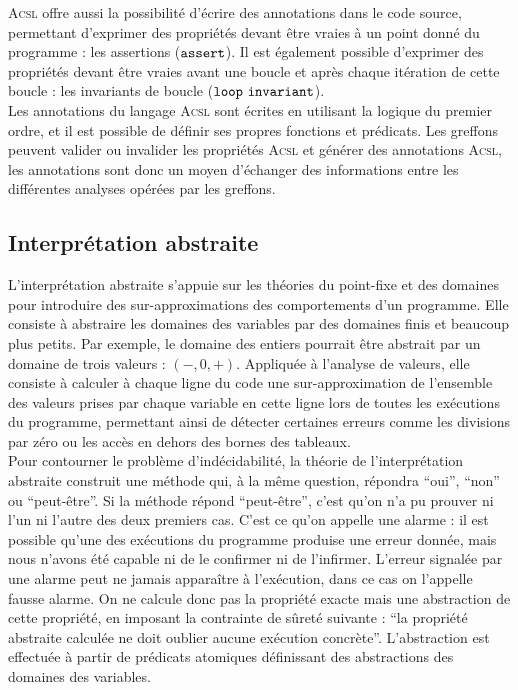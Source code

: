 \textsc{Acsl} offre aussi la possibilité d'écrire des annotations dans le code
source, permettant d'exprimer des propriétés devant être vraies à un point donné
du programme : les assertions (${\tt assert}$).
Il est également possible d'exprimer des propriétés devant être vraies avant une
boucle et après chaque itération de cette boucle : les invariants de boucle
(${\tt loop\ invariant}$).\\


Les annotations du langage \textsc{Acsl} sont écrites en utilisant la logique
du premier ordre, et il est possible de définir ses propres fonctions et
prédicats.
Les greffons peuvent valider ou invalider les propriétés \textsc{Acsl} et
générer des annotations \textsc{Acsl}, les annotations sont donc un moyen
d'échanger des informations entre les différentes analyses opérées par les
greffons.


\subsection{Interprétation abstraite}
\label{sec:interpretation-abstraite}

L'interprétation abstraite \cite{abstract-interpretation} s'appuie sur les
théories du point-fixe et des domaines pour introduire des sur-approximations
des comportements d'un programme. Elle consiste à abstraire les domaines des
variables par des domaines finis et beaucoup plus petits. Par exemple, le
domaine des entiers pourrait être abstrait par un domaine de trois valeurs :
$(-, 0, +)$. Appliquée à l’analyse de valeurs, elle consiste à calculer à
chaque ligne du code une sur-approximation de l’ensemble des valeurs prises par
chaque variable en cette ligne lors de toutes les exécutions du programme,
permettant ainsi de détecter certaines erreurs comme les divisions par zéro ou
les accès en dehors des bornes des tableaux.\\

Pour contourner le problème d’indécidabilité, la théorie de l’interprétation
abstraite construit une méthode qui, à la même question, répondra ``oui'',
``non'' ou ``peut-être''. Si la méthode répond ``peut-être'', c’est qu’on n’a pu
prouver ni l’un ni l’autre des deux premiers cas. C’est ce qu’on appelle une
alarme : il est possible qu’une des exécutions du programme produise une erreur
donnée, mais nous n’avons été capable ni de le confirmer ni de l’infirmer.
L’erreur signalée par une alarme peut ne jamais apparaître à l’exécution, dans
ce cas on l’appelle fausse alarme. On ne calcule donc pas la propriété exacte
mais une abstraction de cette propriété, en imposant la contrainte de sûreté
suivante : ``la propriété abstraite calculée ne doit oublier aucune exécution
concrète''. L'abstraction est effectuée à partir de prédicats atomiques
définissant des abstractions des domaines des variables.\\

